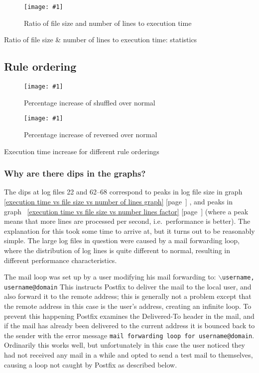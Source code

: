 \documentclass[a4paper,12pt,draft]{article}
\newcommand{\showgraph}[3]{
    \begin{figure}[hbt!]
        \caption{#2}\label{#3}
        \texttt{[image: \#1]}
    \end{figure}
}
\newcommand{\showtable}[3]{
    \begin{table}[ht]
        \caption{#2}\label{#3}
        
    \end{table}
}
\newcommand{\refwithpage}[1]{%
    \empty{}\ref{#1} [page~\pageref{#1}]%
}
\newcommand{\tab}[0]{%
    \hspace*{2em}%
}
\begin{document}
\showgraph{build/plot-normal-filesize-numlines-factor}{Ratio of file
size and number of lines to execution time}{execution time vs file size vs
number lines factor}

\showtable{build/stats-normal-filesize-line-count-include}{Ratio of file
size \& number of lines to execution time: statistics}{execution time vs
file size vs number lines factor table}

\clearpage

\subsection{Rule ordering}

\label{rule ordering graphs}

\showgraph{build/plot-normal-shuffle-factor}{Percentage increase of
shuffled over normal}{percentage increase of shuffled over normal}

\showgraph{build/plot-normal-reverse-factor}{Percentage increase of
reversed over normal}{percentage increase of reversed over normal}

\showtable{build/stats-normal-shuffle-reverse-include}{Execution time
increase for different rule orderings}{Execution time increase for
different rule orderings}

\subsubsection{Why are there dips in the graphs?}
\label{Why are there dips in the graphs?}

The dips at log files 22 and 62--68 correspond to peaks in log file size in
graph~\refwithpage{execution time vs file size vs number of lines graph},
and peaks in graph~\refwithpage{execution time vs file size vs number lines
factor} (where a peak means that more lines are processed per second, i.e.\
performance is better).  The explanation for this took some time to arrive
at, but it turns out to be reasonably simple.  The large log files in
question were caused by a mail forwarding loop, where the distribution of
log lines is quite different to normal, resulting in different performance
characteristics.

The mail loop was set up by a user modifying his mail forwarding to:
\newline \tab{}\texttt{$\backslash$username, username@domain} \newline This
instructs Postfix to deliver the mail to the local user, and also forward
it to the remote address; this is generally not a problem except that the
remote address in this case is the user's address, creating an infinite
loop.  To prevent this happening Postfix examines the Delivered-To header
in the mail, and if the mail has already been delivered to the current
address it is bounced back to the sender with the error message
\texttt{mail forwarding loop for username@domain}.  Ordinarily this works
well, but unfortunately in this case the user noticed they had not received
any mail in a while and opted to send a test mail to themselves, causing a
loop not caught by Postfix as described below.
\end{document}
